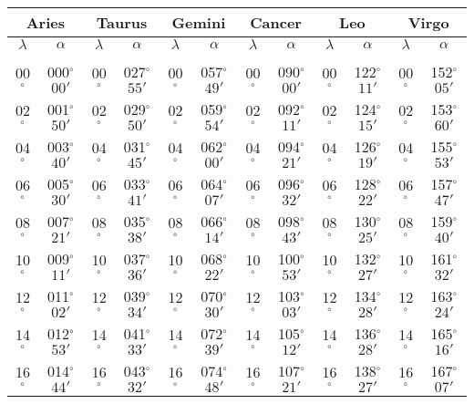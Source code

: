 \begin{table}
\centering
{\small \begin{tabular}{cc|cc|cc|cc|cc|cc}
\multicolumn{2}{c}{Aries}\vline & \multicolumn{2}{c}{Taurus} \vline& \multicolumn{2}{c}{Gemini} \vline& \multicolumn{2}{c}{Cancer}\vline &
\multicolumn{2}{c}{Leo}\vline & \multicolumn{2}{c}{Virgo}\\\hline
$\lambda$& $\alpha$& $\lambda$& $\alpha$& $\lambda$& $\alpha$& $\lambda$& $\alpha$& $\lambda$& $\alpha$& $\lambda$& $\alpha$\\\hline
&&&&&&&&&&&\\[-2ex]
00$^\circ$ & 000$^\circ$$00'$ & 00$^\circ$ & 027$^\circ$$55'$ & 00$^\circ$ & 057$^\circ$$49'$ & 00$^\circ$ & 090$^\circ$$00'$ & 00$^\circ$ & 122$^\circ$$11'$ & 00$^\circ$ & 152$^\circ$$05'$\\
02$^\circ$ & 001$^\circ$$50'$ & 02$^\circ$ & 029$^\circ$$50'$ & 02$^\circ$ & 059$^\circ$$54'$ & 02$^\circ$ & 092$^\circ$$11'$ & 02$^\circ$ & 124$^\circ$$15'$ & 02$^\circ$ & 153$^\circ$$60'$\\
04$^\circ$ & 003$^\circ$$40'$ & 04$^\circ$ & 031$^\circ$$45'$ & 04$^\circ$ & 062$^\circ$$00'$ & 04$^\circ$ & 094$^\circ$$21'$ & 04$^\circ$ & 126$^\circ$$19'$ & 04$^\circ$ & 155$^\circ$$53'$\\
06$^\circ$ & 005$^\circ$$30'$ & 06$^\circ$ & 033$^\circ$$41'$ & 06$^\circ$ & 064$^\circ$$07'$ & 06$^\circ$ & 096$^\circ$$32'$ & 06$^\circ$ & 128$^\circ$$22'$ & 06$^\circ$ & 157$^\circ$$47'$\\
08$^\circ$ & 007$^\circ$$21'$ & 08$^\circ$ & 035$^\circ$$38'$ & 08$^\circ$ & 066$^\circ$$14'$ & 08$^\circ$ & 098$^\circ$$43'$ & 08$^\circ$ & 130$^\circ$$25'$ & 08$^\circ$ & 159$^\circ$$40'$\\
10$^\circ$ & 009$^\circ$$11'$ & 10$^\circ$ & 037$^\circ$$36'$ & 10$^\circ$ & 068$^\circ$$22'$ & 10$^\circ$ & 100$^\circ$$53'$ & 10$^\circ$ & 132$^\circ$$27'$ & 10$^\circ$ & 161$^\circ$$32'$\\
12$^\circ$ & 011$^\circ$$02'$ & 12$^\circ$ & 039$^\circ$$34'$ & 12$^\circ$ & 070$^\circ$$30'$ & 12$^\circ$ & 103$^\circ$$03'$ & 12$^\circ$ & 134$^\circ$$28'$ & 12$^\circ$ & 163$^\circ$$24'$\\
14$^\circ$ & 012$^\circ$$53'$ & 14$^\circ$ & 041$^\circ$$33'$ & 14$^\circ$ & 072$^\circ$$39'$ & 14$^\circ$ & 105$^\circ$$12'$ & 14$^\circ$ & 136$^\circ$$28'$ & 14$^\circ$ & 165$^\circ$$16'$\\
16$^\circ$ & 014$^\circ$$44'$ & 16$^\circ$ & 043$^\circ$$32'$ & 16$^\circ$ & 074$^\circ$$48'$ & 16$^\circ$ & 107$^\circ$$21'$ & 16$^\circ$ & 138$^\circ$$27'$ & 16$^\circ$ & 167$^\circ$$07'$\\

\end{tabular}}
\end{table}

